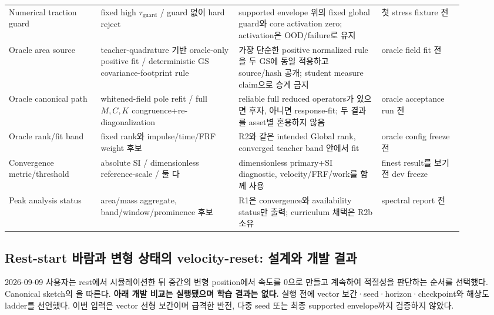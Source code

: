 \documentclass[10pt]{article}
\begin{document}
\begin{longtable}{L{0.18\linewidth}L{0.27\linewidth}L{0.29\linewidth}L{0.16\linewidth}}
Numerical traction guard & fixed high \(\tau_{\mathrm{guard}}\) / guard 없이 hard reject & supported envelope 위의 fixed global guard와 core activation zero; activation은 OOD/failure로 유지 & 첫 stress fixture 전\\
Oracle area source & teacher-quadrature 기반 oracle-only positive fit / deterministic GS covariance-footprint rule & 가장 단순한 positive normalized rule을 두 GS에 동일 적용하고 source/hash 공개; student measure claim으로 승계 금지 & oracle field fit 전\\
Oracle canonical path & whitened-field pole refit / full \(M,C,K\) congruence+re-diagonalization & reliable full reduced operators가 있으면 후자, 아니면 response-fit; 두 결과를 asset별 혼용하지 않음 & oracle acceptance run 전\\
Oracle rank/fit band & fixed rank와 impulse/time/FRF weight 후보 & R2와 같은 intended Global rank, converged teacher band 안에서 fit & oracle config freeze 전\\
Convergence metric/threshold & absolute SI / dimensionless reference-scale / 둘 다 & dimensionless primary+SI diagnostic, velocity/FRF/work를 함께 사용 & finest result를 보기 전 dev freeze\\
Peak analysis status & area/mass aggregate, band/window/prominence 후보 & R1은 convergence와 availability status만 출력; curriculum 채택은 R2b 소유 & spectral report 전\\
\bottomrule
\end{longtable}

\subsection{Rest-start 바람과 변형 상태의 velocity-reset: 설계와 개발 결과}
\label{sec:r1-velocity-reset-plan}

2026-09-09 사용자는 rest에서 시뮬레이션한 뒤 중간의 변형 position에서 속도를 0으로 만들고
계속하여 적절성을 판단하는 순서를 선택했다. Canonical sketch의
을 따른다. \textbf{아래 개발 비교는 실행됐으며 학습 결과는 없다.}
실행 전에 vector 보간·seed·horizon·checkpoint와 해상도 ladder를 선언했다.
이번 입력은 vector 선형 보간이며 급격한 반전, 다중 seed 또는 최종 supported envelope까지 검증하지 않았다.
\end{document}
